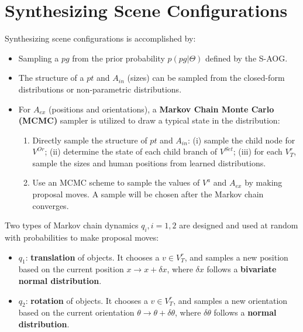 \documentclass[10pt]{article}
\begin{document}
\section{Synthesizing Scene Configurations}%
\label{sec:synthesiz}
Synthesizing scene configurations is accomplished by:
%
\begin{itemize}
  \item Sampling a $pg$ from the prior probability $p(pg \vert \Theta)$ defined
    by the S-AOG\@.
  \item The structure of a $pt$ and $A_{in}$ (sizes) can be sampled from the
    closed-form distributions or non-parametric distributions.
  \item For $A_{ex}$ (positions and orientations), a \textbf{Markov Chain
    Monte Carlo (MCMC)} sampler is utilized to draw a typical state in the
    distribution:
    \begin{enumerate}
      \item Directly sample the structure of $pt$ and $A_{in}$: (i) sample the
        child node for $V^{Or}$; (ii) determine the state of each child branch
        of $V^{Set}$; (iii) for each $V^r_T$, sample the sizes and human
        positions from learned distributions.
      \item Use an MCMC scheme to sample the values of $V^a$ and $A_{ex}$ by
        making proposal moves. A sample will be chosen after the Markov chain
        converges.
    \end{enumerate}
\end{itemize}

Two types of Markov chain dynamics $q_i, i=1,2$ are designed and used at random
with probabilities to make proposal moves:
%
\begin{itemize}
  \item $q_1$: \textbf{translation} of objects. It chooses a $v \in V^r_T$, and
    samples a new position based on the current position
    $x \rightarrow x + \delta x$, where $\delta x$ follows a
    \textbf{bivariate normal distribution}.
  \item $q_2$: \textbf{rotation} of objects. It chooses a $v \in V^r_T$, and
    samples a new orientation based on the current orientation
    $\theta \rightarrow \theta + \delta \theta$, where $\delta \theta$
    follows a \textbf{normal distribution}.
\end{itemize}
\end{document}
